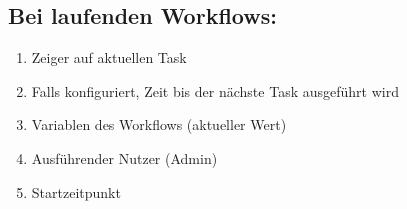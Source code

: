         \subsection{Bei laufenden Workflows:}
            \begin{enumerate}[font={\bfseries}, label={PD2\arabic*}0, wide=0pt, labelindent=1em, leftmargin=*]
                \item Zeiger auf aktuellen Task
                \item Falls konfiguriert, Zeit bis der nächste Task ausgeführt wird
                \item Variablen des Workflows (aktueller Wert)
                \item Ausführender Nutzer (Admin)
                \item Startzeitpunkt
            \end{enumerate}


